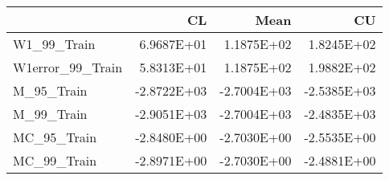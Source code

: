 \begin{tabular}{lrrr}
\toprule
{} &          CL &        Mean &          CU \\
\midrule
W1\_99\_Train      &  6.9687E+01 &  1.1875E+02 &  1.8245E+02 \\
W1error\_99\_Train &  5.8313E+01 &  1.1875E+02 &  1.9882E+02 \\
M\_95\_Train       & -2.8722E+03 & -2.7004E+03 & -2.5385E+03 \\
M\_99\_Train       & -2.9051E+03 & -2.7004E+03 & -2.4835E+03 \\
MC\_95\_Train      & -2.8480E+00 & -2.7030E+00 & -2.5535E+00 \\
MC\_99\_Train      & -2.8971E+00 & -2.7030E+00 & -2.4881E+00 \\
\bottomrule
\end{tabular}
